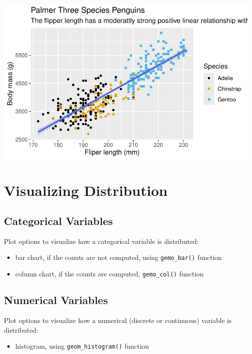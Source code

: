 \documentclass[
  letterpaper,
  DIV=11,
  numbers=noendperiod]{scrreprt}
\providecommand{\tightlist}{%
  \setlength{\itemsep}{0pt}\setlength{\parskip}{0pt}}\usepackage{longtable,booktabs,array}
\begin{document}
\includegraphics{src/r-for-data-science/01-data-viz_files/figure-pdf/unnamed-chunk-17-1.pdf}

\section{Visualizing Distribution}\label{visualizing-distribution}

\subsection{Categorical Variables}\label{categorical-variables}

Plot options to visualize how a categorical variable is distributed:

\begin{itemize}
\tightlist
\item
  bar chart, if the counts are not computed, using \texttt{gemo\_bar()}
  function
\item
  column chart, if the counts are computed, \texttt{gemo\_col()}
  function
\end{itemize}

\subsection{Numerical Variables}\label{numerical-variables}

Plot options to visualize how a numerical (discrete or continuous)
variable is distributed:

\begin{itemize}
\tightlist
\item
  histogram, using \texttt{geom\_histogram()} function
\end{itemize}
\end{document}
